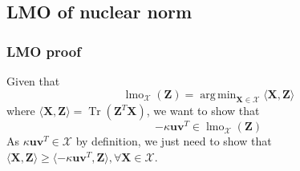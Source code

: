 \documentclass[12pt]{article}
\DeclareMathOperator*{\argmin}{arg\,min}
\DeclareMathOperator*{\lmo}{lmo}
\DeclareMathOperator*{\tr}{Tr}
\newcommand{\boldZ}{\mathbf{Z}}
\newcommand{\boldX}{\mathbf{X}}
\newcommand{\setX}{\mathcal{X}}
\newcommand{\boldu}{\mathbf{u}}
\newcommand{\boldv}{\mathbf{v}}
\begin{document}
\subsection{LMO of nuclear norm}
\subsubsection{LMO proof}
Given that
\begin{equation}
    \lmo_{\setX}(\boldZ) = \argmin_{\boldX \in \setX} \langle \boldX, \boldZ \rangle
\end{equation}
where $\langle \boldX, \boldZ \rangle = \tr(\boldZ^T\boldX)$, we want to show that
\begin{equation}
    -\kappa \boldu \boldv^T \in \lmo_{\setX}(\boldZ)
\end{equation}
As $\kappa \boldu \boldv^T \in \setX$ by definition, we just need to show that $\langle \boldX, \boldZ \rangle \geq \langle -\kappa \boldu \boldv^T, \boldZ \rangle, \forall \boldX \in \setX$.
\end{document}
